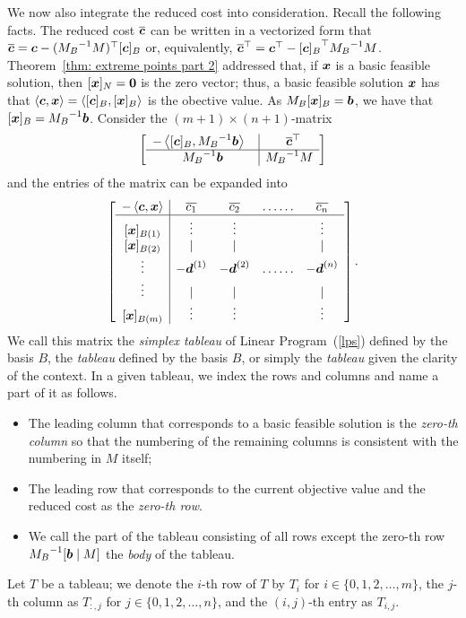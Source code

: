 We now also integrate the reduced cost into consideration. Recall the following facts. The reduced cost $\overline{{\boldsymbol c}}$ can be written in a vectorized form that $\overline{{\boldsymbol c}} = {\boldsymbol c} -  ({M_B}^{-1} M )^\top [{\boldsymbol c}]_B$ or, equivalently, $\overline{{\boldsymbol c}}^\top = {\boldsymbol c}^\top - {[{\boldsymbol c}]_B}^\top {M_B}^{-1} M$. Theorem~\ref{thm: extreme points part 2} addressed that, if ${\boldsymbol x}$ is a basic feasible solution, then $[{\boldsymbol x}]_N = \boldsymbol0$ is the zero vector; thus, a basic feasible solution ${\boldsymbol x}$ has that $\left\langle{\boldsymbol c}, {\boldsymbol x}\right\rangle = \left\langle[{\boldsymbol c}]_B, [{\boldsymbol x}]_B\right\rangle$ is the obective value. As $M_B[{\boldsymbol x}]_B = {\boldsymbol b}$, we have that $[{\boldsymbol x}]_B = {M_B}^{-1}{\boldsymbol b}$. Consider the $(m+1)\times (n+1)$-matrix 
\[
\left[ 
\begin{array}{c|c}
 -\left\langle[{\boldsymbol c}]_B, {M_B}^{-1}{\boldsymbol b}\right\rangle ~~&~~ \overline{{\boldsymbol c}}^\top \\\hline
 {M_B}^{-1}{\boldsymbol b} & {M_B}^{-1} M
\end{array}
 \right]
\] 
and the entries of the matrix can be expanded into
\[
\left[ 
\begin{array}{c|cccc} 
-\left\langle{\boldsymbol c}, {\boldsymbol x}\right\rangle 	& \overline{c_1} 	& \overline{c_2} 	& \hdots\hdots 	& \overline{c_n} \\\hline
{[{\boldsymbol x}]_{B(1)}} 		& \vdots		& \vdots 			&   	& \vdots \\
{[{\boldsymbol x}]_{B(2)}} 		& \mid 		& \mid 			&  	& \mid \\
\vdots 			& -{\boldsymbol d}^{(1)} 	& -{\boldsymbol d}^{(2)} 		& \hdots\hdots 	& -{\boldsymbol d}^{(n)} \\
\vdots 			& \mid 		& \mid 			&  	& \mid \\
{[{\boldsymbol x}]_{B(m)}} 	& \vdots		& \vdots 			&  	& \vdots \\
\end{array}
 \right].
\] 
We call this matrix the {\em simplex tableau} of Linear Program~(\ref{lps}) defined by the basis $B$, the {\em tableau} defined by the basis $B$, or simply the {\em tableau} given the clarity of the context. In a given tableau, we index the rows and columns and name a part of it as follows. 
\begin{itemize}
\item The leading column that corresponds to a basic feasible solution is the {\em zero-th column} so that the numbering of the remaining columns is consistent with the numbering in $M$ itself; 
\item The leading row that corresponds to the current objective value and the reduced cost as the {\em zero-th row}. 
\item We call the part of the tableau consisting of all rows except the zero-th row ${M_B}^{-1} [{\boldsymbol b} \mid M]$ the {\em body} of the tableau. 
\end{itemize}
Let $T$ be a tableau; we denote the $i$-th row of $T$ by $T_i$ for $i\in\{0, 1, 2, \dots, m\}$, the $j$-th column as $T_{:, j}$ for $j \in \{0, 1, 2, \dots, n\}$, and the $(i, j)$-th entry as $T_{i, j}$. 

